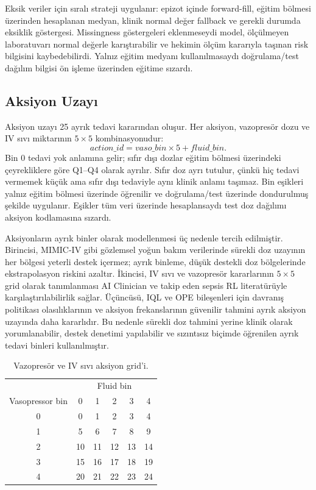 \documentclass[conference]{IEEEtran}
\begin{document}
Eksik veriler için sıralı strateji uygulanır: epizot içinde forward-fill, eğitim bölmesi üzerinden hesaplanan medyan, klinik normal değer fallback ve gerekli durumda eksiklik göstergesi. Missingness göstergeleri eklenmeseydi model, ölçülmeyen laboratuvarı normal değerle karıştırabilir ve hekimin ölçüm kararıyla taşınan risk bilgisini kaybedebilirdi. Yalnız eğitim medyanı kullanılmasaydı doğrulama/test dağılım bilgisi ön işleme üzerinden eğitime sızardı.

\subsection{Aksiyon Uzayı}
Aksiyon uzayı 25 ayrık tedavi kararından oluşur. Her aksiyon, vazopresör dozu ve IV sıvı miktarının $5\times5$ kombinasyonudur:
\begin{equation}
action\_id = vaso\_bin \times 5 + fluid\_bin.
\end{equation}
Bin 0 tedavi yok anlamına gelir; sıfır dışı dozlar eğitim bölmesi üzerindeki çeyrekliklere göre Q1--Q4 olarak ayrılır. Sıfır doz ayrı tutulur, çünkü hiç tedavi vermemek küçük ama sıfır dışı tedaviyle aynı klinik anlamı taşımaz. Bin eşikleri yalnız eğitim bölmesi üzerinde öğrenilir ve doğrulama/test üzerinde dondurulmuş şekilde uygulanır. Eşikler tüm veri üzerinde hesaplansaydı test doz dağılımı aksiyon kodlamasına sızardı.

Aksiyonların ayrık binler olarak modellenmesi üç nedenle tercih edilmiştir. Birincisi, MIMIC-IV gibi gözlemsel yoğun bakım verilerinde sürekli doz uzayının her bölgesi yeterli destek içermez; ayrık binleme, düşük destekli doz bölgelerinde ekstrapolasyon riskini azaltır. İkincisi, IV sıvı ve vazopresör kararlarının $5\times5$ grid olarak tanımlanması AI Clinician ve takip eden sepsis RL literatürüyle karşılaştırılabilirlik sağlar. Üçüncüsü, IQL ve OPE bileşenleri için davranış politikası olasılıklarının ve aksiyon frekanslarının güvenilir tahmini ayrık aksiyon uzayında daha kararlıdır. Bu nedenle sürekli doz tahmini yerine klinik olarak yorumlanabilir, destek denetimi yapılabilir ve sızıntısız biçimde öğrenilen ayrık tedavi binleri kullanılmıştır.

\begin{table}[t]
\centering
\caption{Vazopresör ve IV sıvı aksiyon grid'i.}
\label{tab:action_grid}
\begin{tabular}{c|ccccc}
\toprule
 & \multicolumn{5}{c}{Fluid bin} \\
Vasopressor bin & 0 & 1 & 2 & 3 & 4 \\
\midrule
0 & 0 & 1 & 2 & 3 & 4 \\
1 & 5 & 6 & 7 & 8 & 9 \\
2 & 10 & 11 & 12 & 13 & 14 \\
3 & 15 & 16 & 17 & 18 & 19 \\
4 & 20 & 21 & 22 & 23 & 24 \\
\bottomrule
\end{tabular}
\end{table}
\end{document}
